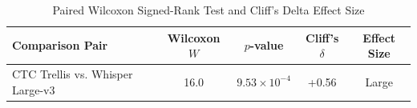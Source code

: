 \begin{table}[t]
\centering
\caption{Paired Wilcoxon Signed-Rank Test and Cliff's Delta Effect Size}
\label{tab:statistical_significance}
\begin{tabular}{lcccc}
\toprule
Comparison Pair & Wilcoxon \(W\) & \(p\)-value & Cliff's \(\delta\) & Effect Size \\
\midrule
CTC Trellis vs. Whisper Large-v3 & 16.0 & $9.53 \times 10^{-4}$ & +0.56 & Large \\
\bottomrule
\end{tabular}
\end{table}
